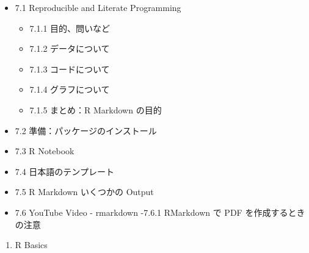 \documentclass[
  xelatex, ja=standard]{bxjsbook}
\providecommand{\tightlist}{%
  \setlength{\itemsep}{0pt}\setlength{\parskip}{0pt}}
\theoremstyle{definition}
\theoremstyle{definition}
\theoremstyle{definition}
\theoremstyle{definition}
\theoremstyle{remark}
\begin{document}
\begin{itemize}
\tightlist
\item
  7.1 Reproducible and Literate Programming

  \begin{itemize}
  \tightlist
  \item
    7.1.1 目的、問いなど
  \item
    7.1.2 データについて
  \item
    7.1.3 コードについて
  \item
    7.1.4 グラフについて
  \item
    7.1.5 まとめ：R Markdown の目的
  \end{itemize}
\item
  7.2 準備：パッケージのインストール
\item
  7.3 R Notebook
\item
  7.4 日本語のテンプレート
\item
  7.5 R Markdown いくつかの Output
\item
  7.6 YouTube Video - rmarkdown -7.6.1 RMarkdown で PDF を作成するときの注意
\end{itemize}

\begin{enumerate}
\def\labelenumi{\arabic{enumi}.}
\setcounter{enumi}{22}
\tightlist
\item
  R Basics
\end{enumerate}
\end{document}
